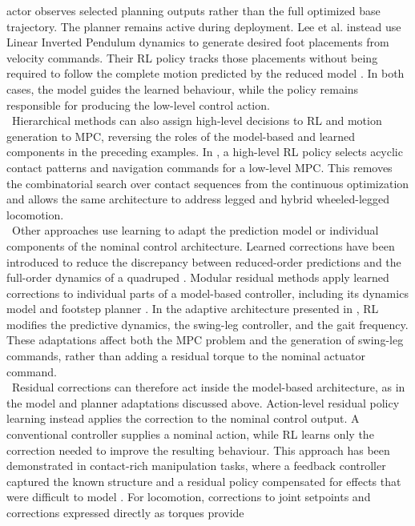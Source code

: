 actor observes selected planning outputs rather than the full optimized base
trajectory. The planner remains active during deployment.
Lee et al. instead use Linear Inverted Pendulum dynamics
to generate desired foot placements from velocity commands. Their RL policy
tracks those placements without being required to follow the complete motion
predicted by the reduced model \cite{footstep_rl}. In both cases, the model
guides the learned behaviour, while the policy remains responsible for
producing the low-level control action.\\
\
Hierarchical methods  can also assign high-level decisions to RL and motion generation
to MPC, reversing the roles of the model-based and learned components in the
preceding examples. In
\cite{non_gaited}, a high-level RL policy selects acyclic contact patterns and
navigation commands for a low-level MPC. This removes the combinatorial search
over contact sequences from the continuous optimization and allows the same
architecture to address legged and hybrid wheeled-legged locomotion.\\
\
Other approaches use learning to adapt the prediction model or individual
components of the nominal control architecture. Learned corrections have been introduced
to reduce the
discrepancy between reduced-order predictions and the full-order dynamics of a
quadruped \cite{model_gap}. Modular residual methods apply learned corrections
to individual parts of a model-based controller, including its dynamics model
and footstep planner \cite{modular_residual}. In the adaptive architecture
presented in \cite{adaptive_mpc}, RL modifies the predictive dynamics, the
swing-leg controller, and the gait frequency. These adaptations affect both
the MPC problem and the generation of swing-leg commands, rather than adding
a residual torque to the nominal actuator command.\\
\
Residual corrections can therefore act inside the model-based architecture,
as in the model and planner adaptations discussed above. Action-level residual
policy learning instead applies the correction to the nominal control output. A
conventional
controller supplies a nominal action, while RL learns only the correction
needed to improve the resulting behaviour. This approach has been demonstrated
in contact-rich manipulation tasks, where a feedback controller captured the
known structure and a residual policy compensated for effects that were
difficult to model \cite{residual_robot_control}. For locomotion, corrections
to joint setpoints and corrections expressed directly as torques provide
